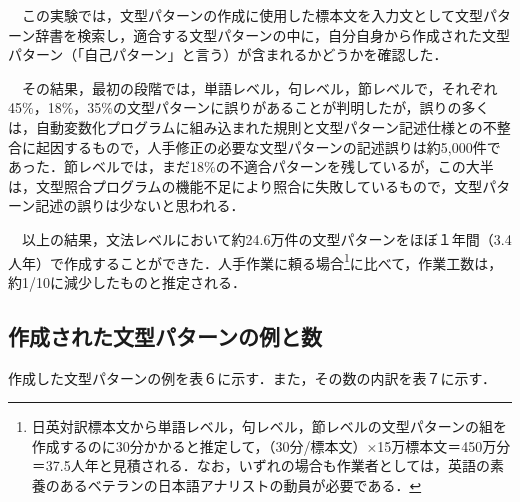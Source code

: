 \documentclass{nlp}
\begin{document}
\begin{description}
　この実験では，文型パターンの作成に使用した標本文を入力文として文型パターン辞書を検索し，適合する文型パターンの中に，自分自身から作成された文型パターン（「自己パターン」と言う）が含まれるかどうかを確認した．

　その結果，最初の段階では，単語レベル，句レベル，節レベルで，それぞれ45\%，18\%，35\%の文型パターンに誤りがあることが判明したが，誤りの多くは，自動変数化プログラムに組み込まれた規則と文型パターン記述仕様との不整合に起因するもので，人手修正の必要な文型パターンの記述誤りは約5,000件であった．節レベルでは，まだ18\%の不適合パターンを残しているが，この大半は，文型照合プログラムの機能不足により照合に失敗しているもので，文型パターン記述の誤りは少ないと思われる．

　以上の結果，文法レベルにおいて約24.6万件の文型パターンをほぼ１年間（3.4人年）で作成することができた．人手作業に頼る場合\footnote{日英対訳標本文から単語レベル，句レベル，節レベルの文型パターンの組を作成するのに30分かかると推定して，（30分/標本文）×15万標本文＝450万分＝37.5人年と見積される．なお，いずれの場合も作業者としては，英語の素養のあるベテランの日本語アナリストの動員が必要である．}に比べて，作業工数は，約1/10に減少したものと推定される．

\end{description}

\subsection{作成された文型パターンの例と数}
作成した文型パターンの例を表６に示す．また，その数の内訳を表７に示す．
\end{document}
